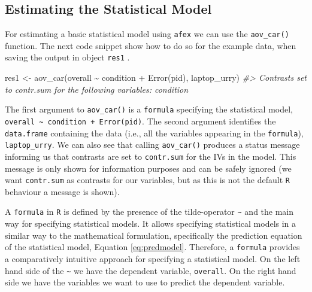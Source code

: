 \documentclass[
]{book}
\newenvironment{Shaded}{\begin{snugshade}}{\end{snugshade}}
\newcommand{\CommentTok}[1]{\textcolor[rgb]{0.56,0.35,0.01}{\textit{#1}}}
\newcommand{\FunctionTok}[1]{\textcolor[rgb]{0.00,0.00,0.00}{#1}}
\newcommand{\NormalTok}[1]{#1}
\newcommand{\OtherTok}[1]{\textcolor[rgb]{0.56,0.35,0.01}{#1}}
\newcommand{\SpecialCharTok}[1]{\textcolor[rgb]{0.00,0.00,0.00}{#1}}
\begin{document}
\hypertarget{estimating-the-statistical-model}{%
\subsection{Estimating the Statistical Model}\label{estimating-the-statistical-model}}

For estimating a basic statistical model using \texttt{afex} we can use the \texttt{aov\_car()} function. The next code snippet show how to do so for the example data, when saving the output in object \texttt{res1} .

\begin{Shaded}
\begin{Highlighting}[]
\NormalTok{res1 }\OtherTok{\textless{}{-}} \FunctionTok{aov\_car}\NormalTok{(overall }\SpecialCharTok{\textasciitilde{}}\NormalTok{ condition }\SpecialCharTok{+} \FunctionTok{Error}\NormalTok{(pid), laptop\_urry)}
\CommentTok{\#\textgreater{} Contrasts set to contr.sum for the following variables: condition}
\end{Highlighting}
\end{Shaded}

The first argument to \texttt{aov\_car()} is a \texttt{formula} specifying the statistical model, \texttt{overall\ \textasciitilde{}\ condition\ +\ Error(pid)}. The second argument identifies the \texttt{data.frame} containing the data (i.e., all the variables appearing in the \texttt{formula}), \texttt{laptop\_urry}. We can also see that calling \texttt{aov\_car()} produces a status message informing us that contrasts are set to \texttt{contr.sum} for the IVs in the model. This message is only shown for information purposes and can be safely ignored (we want \texttt{contr.sum} as contrasts for our variables, but as this is not the default \texttt{R} behaviour a message is shown).

A \texttt{formula} in \texttt{R} is defined by the presence of the tilde-operator \texttt{\textasciitilde{}} and the main way for specifying statistical models. It allows specifying statistical models in a similar way to the mathematical formulation, specifically the prediction equation of the statistical model, Equation \eqref{eq:predmodel}. Therefore, a \texttt{formula} provides a comparatively intuitive approach for specifying a statistical model. On the left hand side of the \texttt{\textasciitilde{}} we have the dependent variable, \texttt{overall}. On the right hand side we have the variables we want to use to predict the dependent variable.
\end{document}
